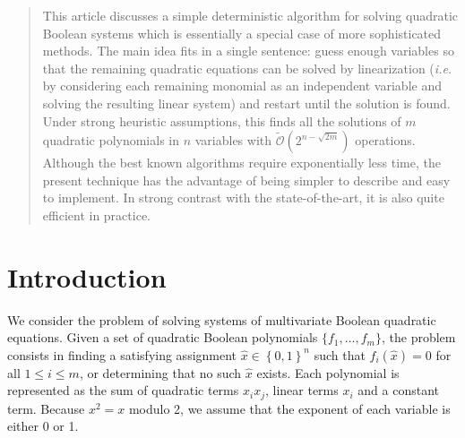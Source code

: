 \documentclass[twoside,leqno]{article}
\newcommand{\bits}{\left\{0, 1\right\}}
\newcommand{\bigOsoft}[1]{\ensuremath{\mathcal{\tilde O}\left( #1 \right)} }
\begin{document}

\begin{abstract} \small\baselineskip=9pt This article discusses a simple deterministic algorithm for solving quadratic
  Boolean systems which is essentially a special case of more sophisticated
  methods. The main idea fits in a single sentence: guess enough variables so
  that the remaining quadratic equations can be solved by linearization
  (\textit{i.e.} by considering each remaining monomial as an independent
  variable and solving the resulting linear system) and restart until the solution
  is found. Under strong heuristic
  assumptions, this finds all the solutions of $m$ quadratic polynomials in $n$
  variables with $\bigOsoft{2^{n-\sqrt{2m}}}$ operations. Although the best
  known algorithms require exponentially less time, the present technique has
  the advantage of being simpler to describe and easy to implement. In strong
  contrast with the state-of-the-art, it is also quite efficient in practice.\end{abstract}



\section{Introduction}

We consider the problem of solving systems of multivariate Boolean quadratic
equations. Given a set of quadratic Boolean polynomials $\{f_1, \dots, f_m\}$,
the problem consists in finding a satisfying assignment $\hat x \in \bits^n$
such that $f_i(\hat x) = 0$ for all $1 \leq i \leq m$, or determining that no
such $\hat x$ exists. Each polynomial is represented as the sum of quadratic
terms $x_i x_j$, linear terms $x_i$ and a constant term. Because $x^2 = x$
modulo 2, we assume that the exponent of each variable is either 0 or 1.


\end{document}
